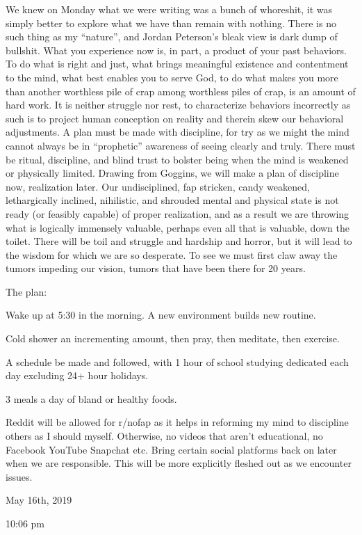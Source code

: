 We knew on Monday what we were writing was a bunch of whoreshit, it was
simply better to explore what we have than remain with nothing. There is
no such thing as my ``nature'', and Jordan Peterson's bleak view is dark
dump of bullshit. What you experience now is, in part, a product of your
past behaviors. To do what is right and just, what brings meaningful
existence and contentment to the mind, what best enables you to serve
God, to do what makes you more than another worthless pile of crap among
worthless piles of crap, is an amount of hard work. It is neither
struggle nor rest, to characterize behaviors incorrectly as such is to
project human conception on reality and therein skew our behavioral
adjustments. A plan must be made with discipline, for try as we might
the mind cannot always be in ``prophetic'' awareness of seeing clearly
and truly. There must be ritual, discipline, and blind trust to bolster
being when the mind is weakened or physically limited. Drawing from
Goggins, we will make a plan of discipline now, realization later. Our
undisciplined, fap stricken, candy weakened, lethargically inclined,
nihilistic, and shrouded mental and physical state is not ready (or
feasibly capable) of proper realization, and as a result we are throwing
what is logically immensely valuable, perhaps even all that is valuable,
down the toilet. There will be toil and struggle and hardship and
horror, but it will lead to the wisdom for which we are so desperate. To
see we must first claw away the tumors impeding our vision, tumors that
have been there for 20 years.

The plan:

Wake up at 5:30 in the morning. A new environment builds new routine.

Cold shower an incrementing amount, then pray, then meditate, then
exercise.

A schedule be made and followed, with 1 hour of school studying
dedicated each day excluding 24+ hour holidays.

3 meals a day of bland or healthy foods.

Reddit will be allowed for r/nofap as it helps in reforming my mind to
discipline others as I should myself. Otherwise, no videos that aren't
educational, no Facebook YouTube Snapchat etc. Bring certain social
platforms back on later when we are responsible. This will be more
explicitly fleshed out as we encounter issues.

\bigskip
\bigskip
May 16th, 2019

10:06 pm

